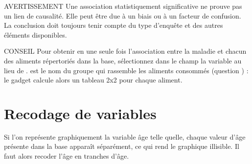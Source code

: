 \begin{mybox}[colbacktitle=CAUTION]{\faFire{} AVERTISSEMENT}
Une association statistiquement significative ne prouve pas un lien de causalité. Elle peut être due à un biais ou à un facteur de confusion. La conclusion doit toujours tenir compte du type d'enquête et des autres éléments disponibles.
\end{mybox}

\begin{mybox}[colbacktitle=TIP]{\faLightbulb{} CONSEIL}
Pour obtenir en une seule fois l'association entre la maladie et chacun des aliments répertoriés dans la base, sélectionnez dans le champ  la variable  au lieu de .  est le nom du groupe qui rassemble les aliments consommés (question ) : le gadget calcule alors un tableau 2x2 pour chaque aliment.
\end{mybox}

\section{Recodage de variables}
\label{recodage}

Si l'on représente graphiquement la variable âge telle quelle, chaque valeur d'âge présente dans la base apparaît séparément, ce qui rend le graphique illisible. Il faut alors recoder l'âge en tranches d'âge.

